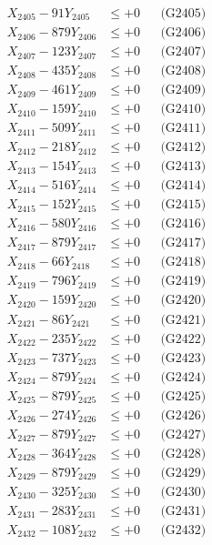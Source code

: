 \documentclass[a4paper,10pt]{article}
\begin{document}
{\begin{align}
X_{2405} - 91Y_{2405} &\leq +0 && \text{(G2405)} \\
X_{2406} - 879Y_{2406} &\leq +0 && \text{(G2406)} \\
X_{2407} - 123Y_{2407} &\leq +0 && \text{(G2407)} \\
X_{2408} - 435Y_{2408} &\leq +0 && \text{(G2408)} \\
X_{2409} - 461Y_{2409} &\leq +0 && \text{(G2409)} \\
X_{2410} - 159Y_{2410} &\leq +0 && \text{(G2410)} \\
\allowbreak
X_{2411} - 509Y_{2411} &\leq +0 && \text{(G2411)} \\
X_{2412} - 218Y_{2412} &\leq +0 && \text{(G2412)} \\
X_{2413} - 154Y_{2413} &\leq +0 && \text{(G2413)} \\
X_{2414} - 516Y_{2414} &\leq +0 && \text{(G2414)} \\
X_{2415} - 152Y_{2415} &\leq +0 && \text{(G2415)} \\
X_{2416} - 580Y_{2416} &\leq +0 && \text{(G2416)} \\
X_{2417} - 879Y_{2417} &\leq +0 && \text{(G2417)} \\
X_{2418} - 66Y_{2418} &\leq +0 && \text{(G2418)} \\
X_{2419} - 796Y_{2419} &\leq +0 && \text{(G2419)} \\
X_{2420} - 159Y_{2420} &\leq +0 && \text{(G2420)} \\
\allowbreak
X_{2421} - 86Y_{2421} &\leq +0 && \text{(G2421)} \\
X_{2422} - 235Y_{2422} &\leq +0 && \text{(G2422)} \\
X_{2423} - 737Y_{2423} &\leq +0 && \text{(G2423)} \\
X_{2424} - 879Y_{2424} &\leq +0 && \text{(G2424)} \\
X_{2425} - 879Y_{2425} &\leq +0 && \text{(G2425)} \\
X_{2426} - 274Y_{2426} &\leq +0 && \text{(G2426)} \\
X_{2427} - 879Y_{2427} &\leq +0 && \text{(G2427)} \\
X_{2428} - 364Y_{2428} &\leq +0 && \text{(G2428)} \\
X_{2429} - 879Y_{2429} &\leq +0 && \text{(G2429)} \\
X_{2430} - 325Y_{2430} &\leq +0 && \text{(G2430)} \\
\allowbreak
X_{2431} - 283Y_{2431} &\leq +0 && \text{(G2431)} \\
X_{2432} - 108Y_{2432} &\leq +0 && \text{(G2432)} \\

\end{align}}
\end{document}
